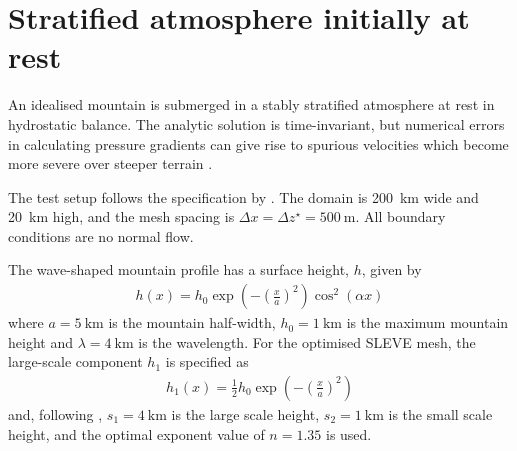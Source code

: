 \section{Stratified atmosphere initially at rest}


An idealised mountain is submerged in a stably stratified atmosphere at rest in hydrostatic balance.  The analytic solution is time-invariant, but numerical errors in calculating pressure gradients can give rise to spurious velocities which become more severe over steeper terrain \citep{klemp2011}.

The test setup follows the specification by \cite{klemp2011}.  The domain is \SI{200}{\kilo\meter} wide and \SI{20}{\kilo\meter} high, and the mesh spacing is \(\Delta x = \Delta z^\star = \SI{500}{\meter}\).  All boundary conditions are no normal flow.

The wave-shaped mountain profile has a surface height, $h$, given by
\begin{align}
	h(x) = h_0 \exp \left( - \left( \frac{x}{a} \right)^2 \right) \cos^2 \left( \alpha x \right) \label{eqn:resting:mountain}
\end{align}
where $a = \SI{5}{\kilo\meter}$ is the mountain half-width, $h_0 = \SI{1}{\kilo\meter}$ is the maximum mountain height and $\lambda = \SI{4}{\kilo\meter}$ is the wavelength.  For the optimised SLEVE mesh, the large-scale component $h_1$ is specified as
\begin{align}
h_1(x) = \frac{1}{2} h_0 \exp \left( - \left( \frac{x}{a} \right)^2 \right)
\end{align}
and, following \cite{leuenberger2010}, $s_1 = \SI{4}{\kilo\meter}$ is the large scale height, $s_2 = \SI{1}{\kilo\meter}$ is the small scale height, and the optimal exponent value of $n = 1.35$ is used.


